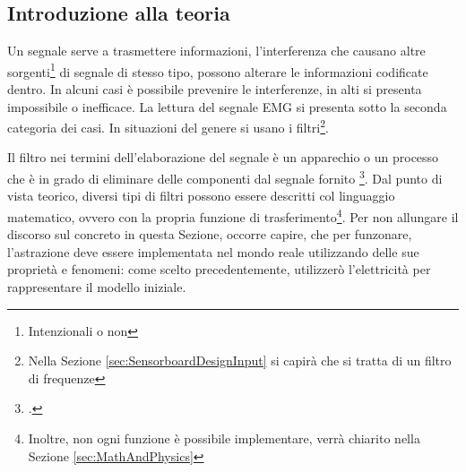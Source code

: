 \documentclass[a4paper, 10pt, final]{article} %
\begin{document}
    \subsection{Introduzione alla teoria}\label{sec:IntroFiltersSignals}
    Un segnale serve a trasmettere informazioni, l'interferenza che causano altre sorgenti\footnote{Intenzionali o non} di segnale di stesso tipo, possono alterare le informazioni codificate dentro.
    In alcuni casi \`{e} possibile prevenire le interferenze, in alti si presenta impossibile o inefficace.
    La lettura del segnale EMG si presenta sotto la seconda categoria dei casi.
    In situazioni del genere si usano i filtri\footnote{Nella Sezione \ref{sec:SensorboardDesignInput} si capir\`{a} che si tratta di un filtro di frequenze}.
    
    Il filtro nei termini dell'elaborazione del segnale \`{e} un apparechio o un processo che \`{e} in grado di eliminare delle componenti dal segnale fornito \footcite[]{Filter:Wiki}.
    Dal punto di vista teorico, diversi tipi di filtri possono essere descritti col linguaggio matematico, ovvero con la propria funzione di trasferimento\footnote{Inoltre, non ogni funzione \`{e} possibile implementare, verr\`{a} chiarito nella Sezione \ref{sec:MathAndPhysics}}.
    Per non allungare il discorso sul concreto in questa Sezione, occorre capire, che per funzonare, l'astrazione deve essere implementata nel mondo reale utilizzando delle sue propriet\`{a} e fenomeni: come scelto precedentemente, utilizzer\`{o} l'elettricit\`{a} per rappresentare il modello iniziale.
\end{document}
